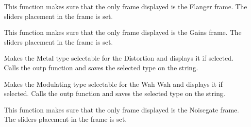 \documentclass[letterpaper,10pt,english]{sphinxmanual}
\begin{document}

\begin{fulllineitems}
\label{Code:GUI.Flanger}
This function makes sure that the only frame displayed is the Flanger frame. The sliders placement in the frame is set.

\end{fulllineitems}


\begin{fulllineitems}
\label{Code:GUI.Gains}
This function makes sure that the only frame displayed is the Gains frame. The sliders placement in the frame is set.

\end{fulllineitems}


\begin{fulllineitems}
\label{Code:GUI.METAL_val}
Makes the Metal type selectable for the Distortion and displays it if selected. Calls the outp function and saves the selected 
type on the string.

\end{fulllineitems}


\begin{fulllineitems}
\label{Code:GUI.MOD_val}
Makes the Modulating type selectable for the Wah Wah and displays it if selected. Calls the outp function and saves the selected 
type on the string.

\end{fulllineitems}


\begin{fulllineitems}
\label{Code:GUI.NoiseGate}
This function makes sure that the only frame displayed is the Noisegate frame. The sliders placement in the frame is set.

\end{fulllineitems}

\end{document}
